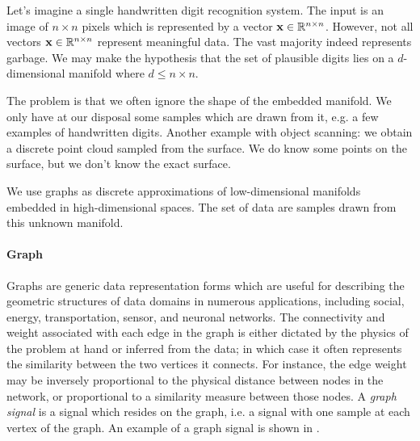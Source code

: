 Let's imagine a single handwritten digit recognition system. The input is an image of $n \times n$ pixels which is represented by a vector $\mathbf{x} \in \mathbb{R}^{n \times n}$. However, not all vectors $\mathbf{x} \in \mathbb{R}^{n \times n}$ represent meaningful data. The vast majority indeed represents garbage. We may make the hypothesis that the set of plausible digits lies on a $d$-dimensional manifold where $d \leq n \times n$.

The problem is that we often ignore the shape of the embedded manifold. We only have at our disposal some samples which are drawn from it, e.g. a few examples of handwritten digits. Another example with object scanning: we obtain a discrete point cloud sampled from the surface. We do know some points on the surface, but we don't know the exact surface.

We use graphs as discrete approximations of low-dimensional manifolds embedded in high-dimensional spaces. The set of data are samples drawn from this unknown manifold.



\paragraph{Graph}
Graphs are generic data representation forms which are useful for describing the geometric structures of data domains in numerous applications, including social, energy, transportation, sensor, and neuronal networks. The connectivity and weight associated with each edge in the graph is either dictated by the physics of the problem at hand or inferred from the data; in which case it often represents the similarity between the two vertices it connects. For instance, the edge weight may be inversely proportional to the physical distance between nodes in the network, or proportional to a similarity measure between those nodes. A \textit{graph signal} is a signal which resides on the graph, i.e. a signal with one sample at each vertex of the graph. An example of a graph signal is shown in .

